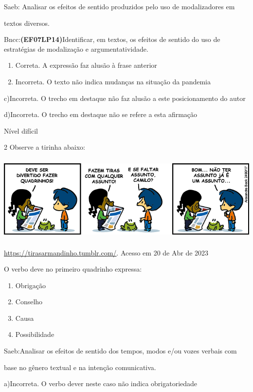 {Saeb: Analisar os efeitos de sentido produzidos pelo uso de
modalizadores em

textos diversos.

Bncc:\textbf{(EF07LP14)}Identificar, em textos, os efeitos de sentido do
uso de estratégias de modalização e argumentatividade.

\begin{enumerate}
\def\labelenumi{\arabic{enumi}.}
\item
  Correta. A expressão faz alusão à frase anterior
\item
  Incorreta. O texto não indica mudanças na situação da pandemia
\end{enumerate}

c)Incorreta. O trecho em destaque não faz alusão a este posicionamento
do autor

d)Incorreta. O trecho em destaque não se refere a esta afirmação

Nível difícil

\num{2}
Observe a tirinha abaixo:

\includegraphics[width=5.90551in,height=1.70833in]{./imgSAEB_7_POR/media/image12.png}

\href{https://tirasarmandinho.tumblr.com/}{\uline{https://tirasarmandinho.tumblr.com/}}.
Acesso em 20 de Abr de 2023

O verbo deve no primeiro quadrinho expressa:

\begin{enumerate}
\def\labelenumi{\alph{enumi})}
\item
  Obrigação
\item
  Conselho
\item
  Causa
\item
  Possibilidade
\end{enumerate}

Saeb:Analisar os efeitos de sentido dos tempos, modos e/ou vozes verbais
com

base no gênero textual e na intenção comunicativa.

a)Incorreta. O verbo dever neste caso não indica obrigatoriedade

}
